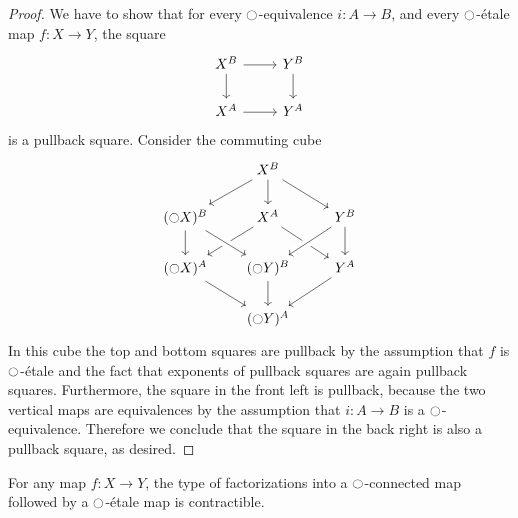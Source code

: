 \documentclass[9pt,twosided]{amsart}
\begin{document}
\begin{proof}
We have to show that for every ${\ocircle}$-equivalence $i:A\to B$, and every ${\ocircle}$-\'etale map $f:X\to Y$, the square
\begin{equation*}
\begin{tikzcd}
X^B \arrow[r] \arrow[d] & Y^B \arrow[d] \\
X^A \arrow[r] & Y^A
\end{tikzcd}
\end{equation*}
is a pullback square. Consider the commuting cube
\begin{equation*}
\begin{tikzcd}
&[-1ex] X^B \arrow[dl] \arrow[d] \arrow[dr] \\
(\modal X)^B \arrow[d] & X^A \arrow[dl] \arrow[dr] & Y^B \arrow[d] \arrow[dl,crossing over] \\
(\modal X)^A \arrow[dr] & (\modal Y)^B \arrow[from=ul,crossing over] \arrow[d] & Y^A \arrow[dl] \\
& (\modal Y)^A
\end{tikzcd}
\end{equation*}
In this cube the top and bottom squares are pullback by the assumption that $f$ is ${\ocircle}$-\'etale and the fact that exponents of pullback squares are again pullback squares. Furthermore, the square in the front left is pullback, because the two vertical maps are equivalences by the assumption that $i:A\to B$ is a ${\ocircle}$-equivalence. Therefore we conclude that the square in the back right is also a pullback square, as desired.
\end{proof}

\begin{cor}
For any map $f:X\to Y$, the type of factorizations into a ${\ocircle}$-connected map followed by a ${\ocircle}$-\'etale map is contractible.
\end{cor}
\end{document}
